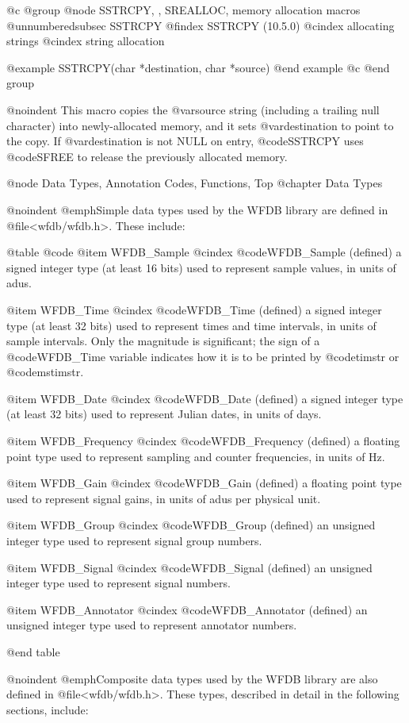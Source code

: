 {{{{{{{{{@c @group
@node     SSTRCPY, , SREALLOC, memory allocation macros
@unnumberedsubsec SSTRCPY
@findex SSTRCPY (10.5.0)
@cindex allocating strings
@cindex string allocation

@example
SSTRCPY(char *destination, char *source)
@end example
@c @end group

@noindent
This macro copies the @var{source} string (including a trailing null character)
into newly-allocated memory, and it sets @var{destination} to point to the copy.
If @var{destination} is not NULL on entry, @code{SSTRCPY} uses @code{SFREE}
to release the previously allocated memory.

@node     Data Types, Annotation Codes, Functions, Top
@chapter Data Types

@noindent
@emph{Simple data types} used by the WFDB library are defined in
@file{<wfdb/wfdb.h>}.  These include:

@table @code
@item WFDB_Sample
@cindex @code{WFDB_Sample} (defined)
a signed integer type (at least 16 bits) used to represent sample
values, in units of adus.

@item WFDB_Time
@cindex @code{WFDB_Time} (defined)
a signed integer type (at least 32 bits) used to represent times and
time intervals, in units of sample intervals.  Only the magnitude is
significant;  the sign of a @code{WFDB_Time} variable indicates how it
is to be printed by @code{timstr} or @code{mstimstr}.

@item WFDB_Date
@cindex @code{WFDB_Date} (defined)
a signed integer type (at least 32 bits) used to represent Julian dates,
in units of days.

@item WFDB_Frequency
@cindex @code{WFDB_Frequency} (defined)
a floating point type used to represent sampling and counter
frequencies, in units of Hz.

@item WFDB_Gain
@cindex @code{WFDB_Gain} (defined)
a floating point type used to represent signal gains, in units of adus
per physical unit.

@item WFDB_Group
@cindex @code{WFDB_Group} (defined)
an unsigned integer type used to represent signal group numbers.

@item WFDB_Signal
@cindex @code{WFDB_Signal} (defined)
an unsigned integer type used to represent signal numbers.

@item WFDB_Annotator
@cindex @code{WFDB_Annotator} (defined)
an unsigned integer type used to represent annotator numbers.

@end table

@noindent
@emph{Composite data types} used by the WFDB library are also defined in
@file{<wfdb/wfdb.h>}.  These types, described in detail in the following
sections, include:

}}}}}}}}}
